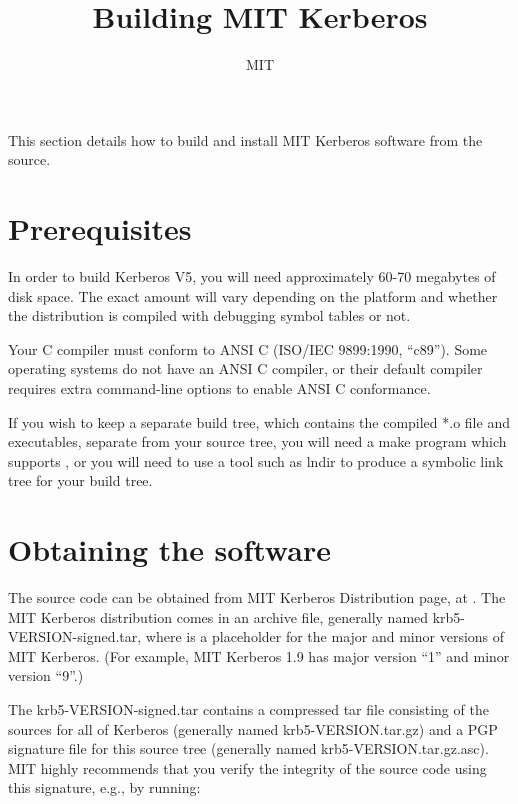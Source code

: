 \documentclass[letterpaper,10pt,english]{sphinxmanual}
\title{Building MIT Kerberos}
\date{ }
\author{MIT}
\begin{document}
\maketitle
\sphinxtableofcontents
{}\label{\detokenize{build/index::doc}}


This section details how to build and install MIT Kerberos software
from the source.


\chapter{Prerequisites}
\label{\detokenize{build/index:building-kerberos-v5}}\label{\detokenize{build/index:prerequisites}}\label{\detokenize{build/index:build-v5}}
In order to build Kerberos V5, you will need approximately 60-70
megabytes of disk space.  The exact amount will vary depending on the
platform and whether the distribution is compiled with debugging
symbol tables or not.

Your C compiler must conform to ANSI C (ISO/IEC 9899:1990, “c89”).
Some operating systems do not have an ANSI C compiler, or their
default compiler requires extra command-line options to enable ANSI C
conformance.

If you wish to keep a separate build tree, which contains the compiled
*.o file and executables, separate from your source tree, you will
need a make program which supports , or you will need to use
a tool such as lndir to produce a symbolic link tree for your build
tree.


\chapter{Obtaining the software}
\label{\detokenize{build/index:obtaining-the-software}}
The source code can be obtained from MIT Kerberos Distribution page,
at .
The MIT Kerberos distribution comes in an archive file, generally
named krb5-VERSION-signed.tar, where  is a placeholder for
the major and minor versions of MIT Kerberos.  (For example, MIT
Kerberos 1.9 has major version “1” and minor version “9”.)

The krb5-VERSION-signed.tar contains a compressed tar file consisting
of the sources for all of Kerberos (generally named
krb5-VERSION.tar.gz) and a PGP signature file for this source tree
(generally named krb5-VERSION.tar.gz.asc).  MIT highly recommends that
you verify the integrity of the source code using this signature,
e.g., by running:
\end{document}
